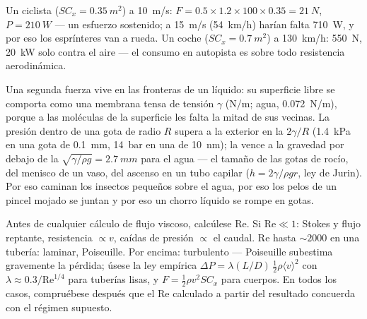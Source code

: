 \begin{example}\label{ex:b2:viscous-flows:cyclist}
Un ciclista ($SC_x = \qty{0.35}{m^2}$) a \qty{10}{m/s}: $F = 0.5 \times 1.2 \times 100
\times 0.35 = \qty{21}{N}$, $P = \qty{210}{W}$ --- un esfuerzo sostenido; a \qty{15}{m/s}
(\qty{54}{km/h}) harían falta \qty{710}{W}, y por eso los esprínteres van a rueda.
Un coche ($SC_x = \qty{0.7}{m^2}$) a \qty{130}{km/h}: \qty{550}{N}, \qty{20}{kW} solo
contra el aire --- el consumo en autopista es sobre todo resistencia aerodinámica.
\end{example}

\begin{remark}\label{rem:b2:viscous-flows:capillarity}
Una segunda fuerza vive en las fronteras de un líquido: su superficie
libre se comporta como una membrana tensa de tensión $\gamma$ (\unit{N/m};
agua, \qty{0.072}{N/m}), porque a las moléculas de la superficie les falta
la mitad de sus vecinas. La presión dentro de una gota de radio $R$ supera
a la exterior en la \emph{} $2\gamma/R$ (\qty{1.4}{kPa} en una gota de \qty{0.1}{mm},
\qty{14}{bar} en una de \qty{10}{nm}); la  vence a la gravedad por debajo de
la \emph{} $\sqrt{\gamma/\rho g} = \qty{2.7}{mm}$ para el agua ---
el tamaño de las gotas de rocío, del menisco de un vaso, del ascenso en un
tubo capilar ($h = 2\gamma/\rho gr$, ley de Jurin). Por eso caminan los
insectos pequeños sobre el agua, por eso los pelos de un pincel mojado se
juntan y por eso un chorro líquido se rompe en gotas.
\end{remark}

\begin{method}\label{met:b2:viscous-flows:regime}
Antes de cualquier cálculo de flujo viscoso, calcúlese $\mathrm{Re}$. Si $\mathrm{Re} \ll 1$:
Stokes y flujo reptante, resistencia $\propto v$, caídas de presión $\propto$ el
caudal. $\mathrm{Re}$ hasta $\sim\!2000$ en una tubería: laminar, Poiseuille. Por encima:
turbulento --- Poiseuille subestima gravemente la pérdida; úsese la ley
empírica $\Delta P = \lambda(L/D)\,\tfrac12\rho\langle v\rangle^2$ con $\lambda
\approx 0.3/\mathrm{Re}^{1/4}$ para tuberías lisas, y $F = \tfrac12\rho v^2SC_x$ para
cuerpos. En todos los casos, compruébese después que el $\mathrm{Re}$ calculado
a partir del resultado concuerda con el régimen supuesto.
\end{method}

